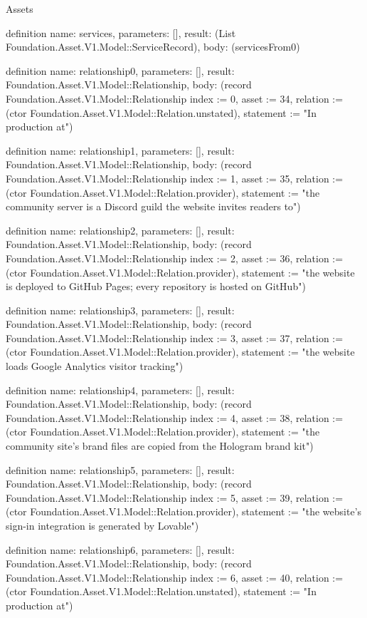 \begin{lexlean}{Assets}
\begin{semanticmodule}
definition{
  name: services,
  parameters: [],
  result: (List Foundation.Asset.V1.Model::ServiceRecord),
  body: (servicesFrom0)
}

definition{
  name: relationship0,
  parameters: [],
  result: Foundation.Asset.V1.Model::Relationship,
  body: (record Foundation.Asset.V1.Model::Relationship {index := 0, asset := 34, relation := (ctor Foundation.Asset.V1.Model::Relation.unstated), statement := "In production at"})
}

definition{
  name: relationship1,
  parameters: [],
  result: Foundation.Asset.V1.Model::Relationship,
  body: (record Foundation.Asset.V1.Model::Relationship {index := 1, asset := 35, relation := (ctor Foundation.Asset.V1.Model::Relation.provider), statement := "the community server is a Discord guild the website invites readers to"})
}

definition{
  name: relationship2,
  parameters: [],
  result: Foundation.Asset.V1.Model::Relationship,
  body: (record Foundation.Asset.V1.Model::Relationship {index := 2, asset := 36, relation := (ctor Foundation.Asset.V1.Model::Relation.provider), statement := "the website is deployed to GitHub Pages; every repository is hosted on GitHub"})
}

definition{
  name: relationship3,
  parameters: [],
  result: Foundation.Asset.V1.Model::Relationship,
  body: (record Foundation.Asset.V1.Model::Relationship {index := 3, asset := 37, relation := (ctor Foundation.Asset.V1.Model::Relation.provider), statement := "the website loads Google Analytics visitor tracking"})
}

definition{
  name: relationship4,
  parameters: [],
  result: Foundation.Asset.V1.Model::Relationship,
  body: (record Foundation.Asset.V1.Model::Relationship {index := 4, asset := 38, relation := (ctor Foundation.Asset.V1.Model::Relation.provider), statement := "the community site's brand files are copied from the Hologram brand kit"})
}

definition{
  name: relationship5,
  parameters: [],
  result: Foundation.Asset.V1.Model::Relationship,
  body: (record Foundation.Asset.V1.Model::Relationship {index := 5, asset := 39, relation := (ctor Foundation.Asset.V1.Model::Relation.provider), statement := "the website's sign-in integration is generated by Lovable"})
}

definition{
  name: relationship6,
  parameters: [],
  result: Foundation.Asset.V1.Model::Relationship,
  body: (record Foundation.Asset.V1.Model::Relationship {index := 6, asset := 40, relation := (ctor Foundation.Asset.V1.Model::Relation.unstated), statement := "In production at"})
}


\end{semanticmodule}
\end{lexlean}
